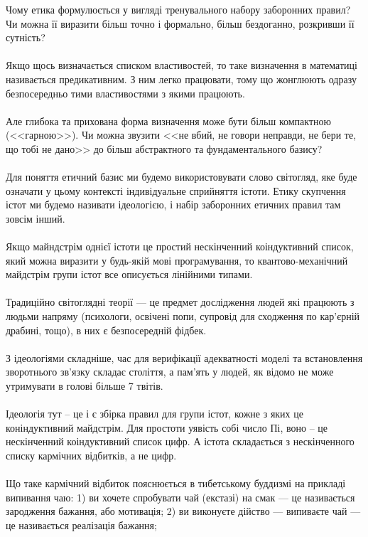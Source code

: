 Чому етика формулюється у вигляді тренувального набору заборонних правил?
Чи можна її виразити більш точно і формально, більш бездоганно, розкривши її сутність?
\\
\\
Якщо щось визначається списком властивостей, то таке визначення в математиці називається
предикативним. З ним легко працювати, тому що жонглюють одразу безпосередньо тими
властивостями з якими працюють.
\\
\\
Але глибока та прихована форма визначення може бути більш компактною (<<гарною>>).
Чи можна звузити <<не вбий, не говори неправди, не бери те, що тобі не дано>> до
більш абстрактного та фундаментального базису?
\\
\\
Для поняття етичний базис ми будемо використовувати слово світогляд, яке буде
означати у цьому контексті індивідуальне сприйняття істоти. Етику скупчення істот ми
будемо називати ідеологією, і набір заборонних етичних правил там зовсім інший.
\\
\\
Якщо майндстрім однієї істоти це простий нескінченний коіндуктивний список,
який можна виразити у будь-якій мові програмування, то квантово-механічний майдстрім
групи істот все описується лінійними типами.\
\\
\\
Традиційно світоглядні теорії --- це предмет дослідження людей які працюють з людьми напряму
(психологи, освічені попи, супровід для сходження по кар'єрній драбині, тощо), в них
є безпосередній фідбек.
\\
\\
З ідеологіями складніше, час для верифікації адекватності моделі та встановлення зворотнього зв'язку
складає століття, а пам'ять у людей, як відомо не може утримувати в голові більше 7 твітів.
\\
\\
Ідеологія тут -- це і є збірка правил для групи істот, кожне з яких це коніндуктивний майдстрім.
Для простоти уявість собі число Пі, воно -- це нескінченний коіндуктивний список цифр. А істота
складається з нескінченного списку кармічних відбитків, а не цифр.
\\
\\
Що таке кармічний відбиток пояснюється в тибетському буддизмі на прикладі випивання чаю:
1) ви хочете спробувати чай (екстазі) на смак --- це називається зародження бажання, або мотивація;
2) ви виконуєте дійство --- випиваєте чай --- це називається реалізація бажання;
